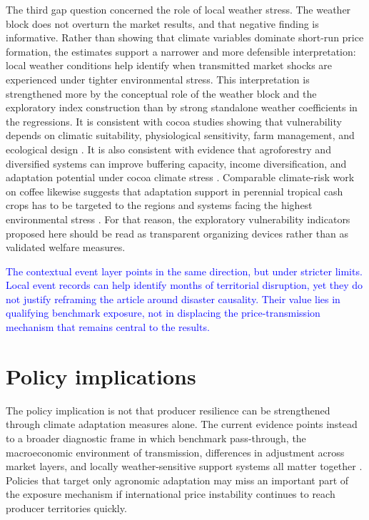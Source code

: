 \documentclass[11pt]{article}
\newcommand{\vTwo}[1]{\textcolor{blue}{#1}}
\begin{document}
The third gap question concerned the role of local weather stress. The weather block does not overturn the market results, and that negative finding is informative. Rather than showing that climate variables dominate short-run price formation, the estimates support a narrower and more defensible interpretation: local weather conditions help identify when transmitted market shocks are experienced under tighter environmental stress. This interpretation is strengthened more by the conceptual role of the weather block and the exploratory index construction than by strong standalone weather coefficients in the regressions. It is consistent with cocoa studies showing that vulnerability depends on climatic suitability, physiological sensitivity, farm management, and ecological design \citep{Schroth2016,Lahive2019}. It is also consistent with evidence that agroforestry and diversified systems can improve buffering capacity, income diversification, and adaptation potential under cocoa climate stress \citep{Jacobi2013,Niether2020,Vaast2014}. Comparable climate-risk work on coffee likewise suggests that adaptation support in perennial tropical cash crops has to be targeted to the regions and systems facing the highest environmental stress \citep{Koh2020,Laderach2016}. For that reason, the exploratory vulnerability indicators proposed here should be read as transparent organizing devices rather than as validated welfare measures.

\vTwo{The contextual event layer points in the same direction, but under stricter limits. Local event records can help identify months of territorial disruption, yet they do not justify reframing the article around disaster causality. Their value lies in qualifying benchmark exposure, not in displacing the price-transmission mechanism that remains central to the results.}

\section{Policy implications}
\label{sec:policy}

The policy implication is not that producer resilience can be strengthened through climate adaptation measures alone. The current evidence points instead to a broader diagnostic frame in which benchmark pass-through, the macroeconomic environment of transmission, differences in adjustment across market layers, and locally weather-sensitive support systems all matter together \citep{Gereffi2005,Merkle2021}. Policies that target only agronomic adaptation may miss an important part of the exposure mechanism if international price instability continues to reach producer territories quickly.
\end{document}
